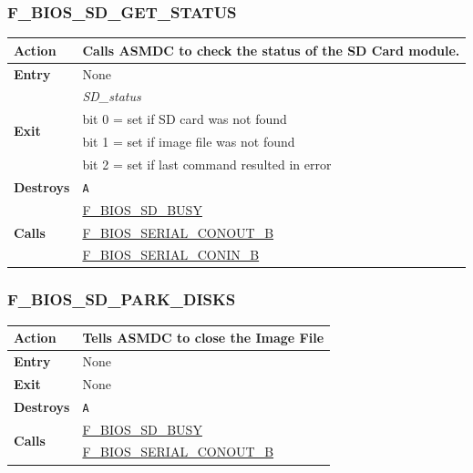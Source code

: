 \documentclass[a4paper,11pt]{article}
\begin{document}
         \subsubsection{F\_BIOS\_SD\_GET\_STATUS}
         \label{func:fbiossdgetstatus}
         \begin{tabular}{l p{9cm}}
             \hline\textbf{Action}
             & Calls \textbf{ASMDC} to check the status of the SD Card module.\\
             \hline\textbf{Entry} & None \\
             \hline\multirow[t]{4}{4em}{\textbf{Exit}}
             & \textit{SD\_status} \\
             & bit 0 = set if SD card was not found \\
             & bit 1 = set if image file was not found \\
             & bit 2 = set if last command resulted in error \\
             \hline\textbf{Destroys} & \texttt{A} \\
             \hline\multirow[t]{3}{4em}{\textbf{Calls}}
             & \hyperref[func:fbiossdbusywait]{F\_BIOS\_SD\_BUSY}\\
             & \hyperref[func:fbiosserialconoutb]{F\_BIOS\_SERIAL\_CONOUT\_B}\\
             & \hyperref[func:fbiosserialconinb]{F\_BIOS\_SERIAL\_CONIN\_B}\\
             \hline
         \end{tabular}

        \subsubsection{F\_BIOS\_SD\_PARK\_DISKS}
        \label{func:fbiossdparkdisks}
        \begin{tabular}{l p{9cm}}
            \hline\textbf{Action}
            & Tells \textbf{ASMDC} to close the Image File\\
            \hline\textbf{Entry} & None \\
            \hline\textbf{Exit} & None \\
            \hline\textbf{Destroys} & \texttt{A} \\
            \hline\multirow[t]{2}{4em}{\textbf{Calls}} 
            & \hyperref[func:fbiossdbusywait]{F\_BIOS\_SD\_BUSY}\\
            & \hyperref[func:fbiosserialconoutb]{F\_BIOS\_SERIAL\_CONOUT\_B}\\
            \hline
        \end{tabular}
\end{document}
